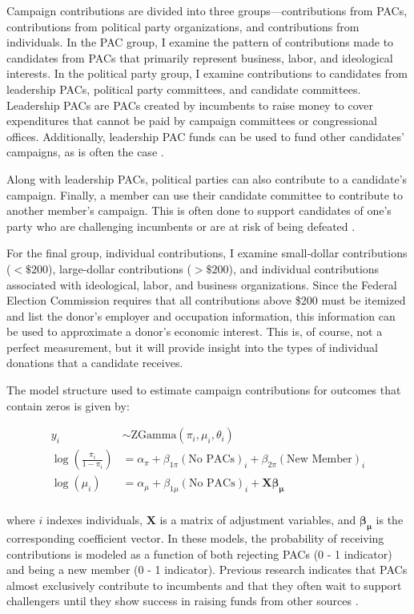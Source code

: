 \documentclass[12pt]{article}
\begin{document}
Campaign contributions are divided into three groups—contributions from PACs, contributions from political party organizations, and contributions from individuals. In the PAC group, I examine the pattern of contributions made to candidates from PACs that primarily represent business, labor, and ideological interests. In the political party group, I examine contributions to candidates from leadership PACs, political party committees, and candidate committees. Leadership PACs are PACs created by incumbents to raise money to cover expenditures that cannot be paid by campaign committees or congressional offices. Additionally, leadership PAC funds can be used to fund other candidates' campaigns, as is often the case \citep{herrnson2009, lazer2015}.

Along with leadership PACs, political parties can also contribute to a candidate's campaign. Finally, a member can use their candidate committee to contribute to another member's campaign. This is often done to support candidates of one's party who are challenging incumbents or are at risk of being defeated \citep{wilcox1989, lazer2015a}. 

For the final group, individual contributions, I examine small-dollar contributions ($< \$200$), large-dollar contributions ($> \$200$), and individual contributions associated with ideological, labor, and business organizations. Since the Federal Election Commission requires that all contributions above \$200 must be itemized and list the donor's employer and occupation information, this information can be used to approximate a donor's economic interest. This is, of course, not a perfect measurement, but it will provide insight into the types of individual donations that a candidate receives. 

The model structure used to estimate campaign contributions for outcomes that contain zeros is given by: 

$$
\begin{aligned}
    y_i &\sim \text{ZGamma}(\pi_i, \mu_i, \theta_i) \\
    \log \left( \frac{\pi_i}{1 - \pi_i} \right) &= \alpha_{\pi} + \beta_{1\pi} (\text{No PACs})_i + \beta_{2\pi} (\text{New Member})_i \\
    \log(\mu_i) &= \alpha_{\mu} + \beta_{1\mu} (\text{No PACs})_i + \bm{X} \bm{\beta_{\mu}} \\
\end{aligned}
$$

\noindent where $i$ indexes individuals, $\bm{X}$ is a matrix of adjustment variables, and $\bm{\beta_{\mu}}$ is the corresponding coefficient vector. In these models, the probability of receiving contributions is modeled as a function of both rejecting PACs (0 - 1 indicator) and being a new member (0 - 1 indicator). Previous research indicates that PACs almost exclusively contribute to incumbents \citep{brunell2005} and that they often wait to support challengers until they show success in raising funds from other sources \citep{biersack1993}. 
\end{document}
